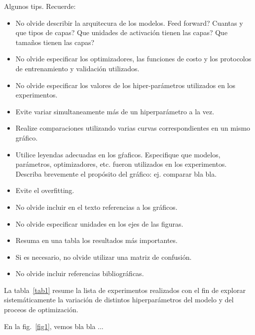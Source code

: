 \documentclass[aps,prl,preprint,groupedaddress]{revtex4-2}
\begin{document}
{\color{red}
Algunos tips. Recuerde:
\begin{itemize}
\item No olvide describir la arquitecura de los modelos. Feed forward? Cuantas y que tipos de capas? Que unidades de activación tienen las capas? Que tamaños tienen las capas?
\item No olvide especificar los optimizadores, las funciones de costo y los protocolos de entrenamiento y validación utilizados.
\item No olvide especificar los valores de los hiper-parámetros utilizados en los experimentos.
\item Evite variar simultaneamente más de un hiperparámetro a la vez.
\item Realize comparaciones utilizando varias curvas correspondientes en un mismo gráfico.
\item Utilice leyendas adecuadas en los gŕaficos. Especifique que modelos, parámetros, optimizadores, etc. fueron utilizados en los experimentos. Describa brevemente el propósito del gráfico: ej. comparar bla bla.
\item Evite el overfitting.
\item No olvide incluir en el texto referencias a los gráficos.
\item No olvide especificar unidades en los ejes de las figuras.
\item Resuma en una tabla los resultados más importantes.
\item Si es necesario, no olvide utilizar una matriz de confusión.
\item No olvide incluir referencias bibliográficas.
\end{itemize}
}

La tabla~\ref{tab1} resume la lista de experimentos realizados con el fin de explorar sistemáticamente la variación de distintos hiperparámetros del modelo y del proceos de optimización.

En la fig.~\ref{fig1}, vemos bla bla ...
\end{document}
